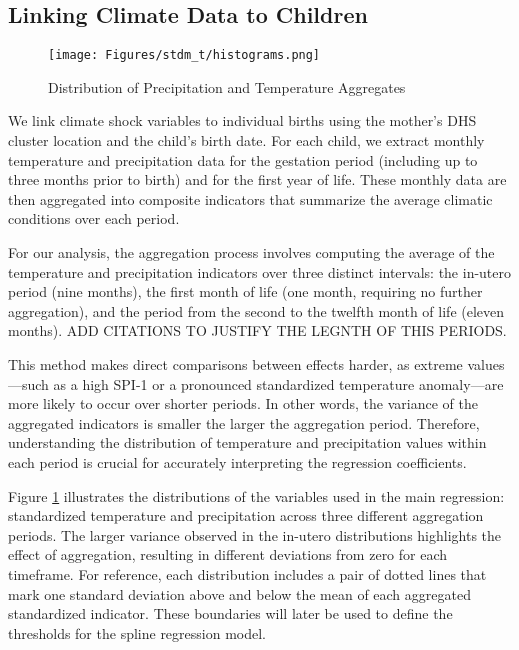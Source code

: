\documentclass[a4paper]{article}
\begin{document}
\subsection{Linking Climate Data to Children}

\begin{figure}[t!]
    \centering
    \caption{Distribution of Precipitation and Temperature Aggregates}
    \label{fig:distributions}
    \texttt{[image: Figures/stdm\_t/histograms.png]}
\end{figure}

We link climate shock variables to individual births using the mother's DHS cluster location and the child's birth date. For each child, we extract monthly temperature and precipitation data for the gestation period (including up to three months prior to birth) and for the first year of life. These monthly data are then aggregated into composite indicators that summarize the average climatic conditions over each period.

For our analysis, the aggregation process involves computing the average of the temperature and precipitation indicators over three distinct intervals: the in-utero period (nine months), the first month of life (one month, requiring no further aggregation), and the period from the second to the twelfth month of life (eleven months). ADD CITATIONS TO JUSTIFY THE LEGNTH OF THIS PERIODS. 

This method makes direct comparisons between effects harder, as extreme values—such as a high SPI-1 or a pronounced standardized temperature anomaly—are more likely to occur over shorter periods. In other words, the variance of the aggregated indicators is smaller the larger the aggregation period. Therefore, understanding the distribution of temperature and precipitation values within each period is crucial for accurately interpreting the regression coefficients.

Figure \ref{fig:distributions} illustrates the distributions of the variables used in the main regression: standardized temperature and precipitation across three different aggregation periods. The larger variance observed in the in-utero distributions highlights the effect of aggregation, resulting in different deviations from zero for each timeframe. For reference, each distribution includes a pair of dotted lines that mark one standard deviation above and below the mean of each aggregated standardized indicator. These boundaries will later be used to define the thresholds for the spline regression model.
\end{document}
